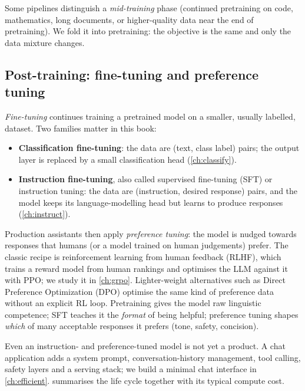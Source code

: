 Some pipelines distinguish a \emph{mid-training} phase (continued pretraining on code, mathematics,
long documents, or higher-quality data near the end of pretraining). We fold it into pretraining: the
objective is the same and only the data mixture changes.

\subsection{Post-training: fine-tuning and preference tuning}
\emph{Fine-tuning} continues training a pretrained model on a smaller, usually labelled, dataset. Two
families matter in this book:
\begin{itemize}
\item \textbf{Classification fine-tuning}: the data are (text, class label) pairs; the output layer is
  replaced by a small classification head (\cref{ch:classify}).
\item \textbf{Instruction fine-tuning}, also called supervised fine-tuning (SFT) or instruction tuning:
  the data are (instruction, desired response) pairs, and the model keeps its language-modelling head
  but learns to produce responses (\cref{ch:instruct}).
\end{itemize}
Production assistants then apply \emph{preference tuning}: the model is nudged towards responses that
humans (or a model trained on human judgements) prefer. The classic recipe is reinforcement learning
from human feedback (RLHF), which trains a reward model from human rankings and optimises the LLM
against it with PPO; we study it in \cref{ch:grpo}. Lighter-weight alternatives such as Direct Preference
Optimization (DPO) optimise the same kind of preference data without an explicit RL loop. Pretraining
gives the model raw linguistic competence; SFT teaches it the \emph{format} of being helpful; preference
tuning shapes \emph{which} of many acceptable responses it prefers (tone, safety, concision).

Even an instruction- and preference-tuned model is not yet a product. A chat application adds a
system prompt, conversation-history management, tool calling, safety layers and a serving stack; we
build a minimal chat interface in \cref{ch:efficient}.  summarises the
life cycle together with its typical compute cost.

